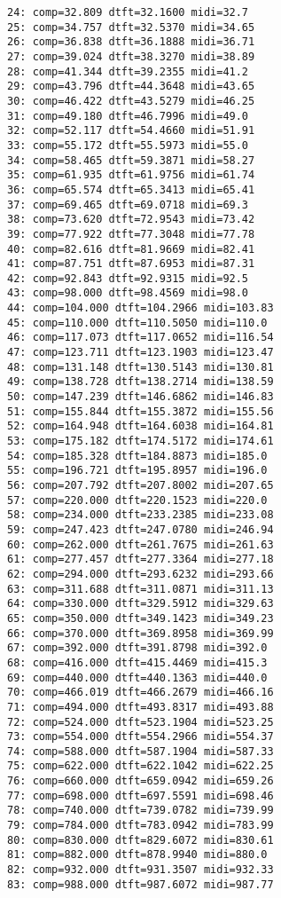 \documentclass[11pt]{article}
\begin{document}
    \begin{Verbatim}[commandchars=\\\{\}]
24: comp=32.809 dtft=32.1600 midi=32.7
25: comp=34.757 dtft=32.5370 midi=34.65
26: comp=36.838 dtft=36.1888 midi=36.71
27: comp=39.024 dtft=38.3270 midi=38.89
28: comp=41.344 dtft=39.2355 midi=41.2
29: comp=43.796 dtft=44.3648 midi=43.65
30: comp=46.422 dtft=43.5279 midi=46.25
31: comp=49.180 dtft=46.7996 midi=49.0
32: comp=52.117 dtft=54.4660 midi=51.91
33: comp=55.172 dtft=55.5973 midi=55.0
34: comp=58.465 dtft=59.3871 midi=58.27
35: comp=61.935 dtft=61.9756 midi=61.74
36: comp=65.574 dtft=65.3413 midi=65.41
37: comp=69.465 dtft=69.0718 midi=69.3
38: comp=73.620 dtft=72.9543 midi=73.42
39: comp=77.922 dtft=77.3048 midi=77.78
40: comp=82.616 dtft=81.9669 midi=82.41
41: comp=87.751 dtft=87.6953 midi=87.31
42: comp=92.843 dtft=92.9315 midi=92.5
43: comp=98.000 dtft=98.4569 midi=98.0
44: comp=104.000 dtft=104.2966 midi=103.83
45: comp=110.000 dtft=110.5050 midi=110.0
46: comp=117.073 dtft=117.0652 midi=116.54
47: comp=123.711 dtft=123.1903 midi=123.47
48: comp=131.148 dtft=130.5143 midi=130.81
49: comp=138.728 dtft=138.2714 midi=138.59
50: comp=147.239 dtft=146.6862 midi=146.83
51: comp=155.844 dtft=155.3872 midi=155.56
52: comp=164.948 dtft=164.6038 midi=164.81
53: comp=175.182 dtft=174.5172 midi=174.61
54: comp=185.328 dtft=184.8873 midi=185.0
55: comp=196.721 dtft=195.8957 midi=196.0
56: comp=207.792 dtft=207.8002 midi=207.65
57: comp=220.000 dtft=220.1523 midi=220.0
58: comp=234.000 dtft=233.2385 midi=233.08
59: comp=247.423 dtft=247.0780 midi=246.94
60: comp=262.000 dtft=261.7675 midi=261.63
61: comp=277.457 dtft=277.3364 midi=277.18
62: comp=294.000 dtft=293.6232 midi=293.66
63: comp=311.688 dtft=311.0871 midi=311.13
64: comp=330.000 dtft=329.5912 midi=329.63
65: comp=350.000 dtft=349.1423 midi=349.23
66: comp=370.000 dtft=369.8958 midi=369.99
67: comp=392.000 dtft=391.8798 midi=392.0
68: comp=416.000 dtft=415.4469 midi=415.3
69: comp=440.000 dtft=440.1363 midi=440.0
70: comp=466.019 dtft=466.2679 midi=466.16
71: comp=494.000 dtft=493.8317 midi=493.88
72: comp=524.000 dtft=523.1904 midi=523.25
73: comp=554.000 dtft=554.2966 midi=554.37
74: comp=588.000 dtft=587.1904 midi=587.33
75: comp=622.000 dtft=622.1042 midi=622.25
76: comp=660.000 dtft=659.0942 midi=659.26
77: comp=698.000 dtft=697.5591 midi=698.46
78: comp=740.000 dtft=739.0782 midi=739.99
79: comp=784.000 dtft=783.0942 midi=783.99
80: comp=830.000 dtft=829.6072 midi=830.61
81: comp=882.000 dtft=878.9940 midi=880.0
82: comp=932.000 dtft=931.3507 midi=932.33
83: comp=988.000 dtft=987.6072 midi=987.77

\end{Verbatim}
\end{document}
